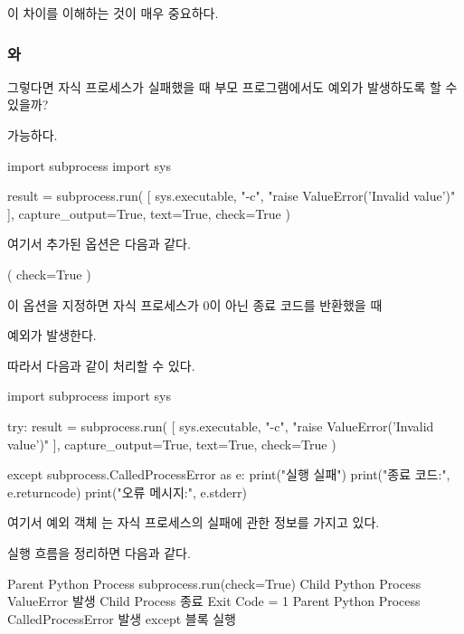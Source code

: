 이 차이를 이해하는 것이 매우 중요하다.

\subsubsection{와 }

그렇다면 자식 프로세스가 실패했을 때 부모 프로그램에서도 예외가 발생하도록 할 수 있을까?

가능하다.

\begin{dhkcode}
import subprocess
import sys

result = subprocess.run(
    [
        sys.executable,
        "-c",
        "raise ValueError('Invalid value')"
    ],
    capture_output=True,
    text=True,
    check=True
)
\end{dhkcode}

여기서 추가된 옵션은 다음과 같다.

\begin{dhkcode}
(
    check=True
)
\end{dhkcode}

이 옵션을 지정하면 자식 프로세스가 0이 아닌 종료 코드를 반환했을 때

 예외가 발생한다.

따라서 다음과 같이 처리할 수 있다.

\begin{dhkcode}
import subprocess
import sys

try:
    result = subprocess.run(
        [
            sys.executable,
            "-c",
            "raise ValueError('Invalid value')"
        ],
        capture_output=True,
        text=True,
        check=True
    )

except subprocess.CalledProcessError as e:
    print("실행 실패")
    print("종료 코드:", e.returncode)
    print("오류 메시지:", e.stderr)
\end{dhkcode}

여기서 예외 객체 는 자식 프로세스의 실패에 관한 정보를 가지고 있다.

실행 흐름을 정리하면 다음과 같다.

\begin{dhksmry}[centered]
Parent Python Process
\da
subprocess.run(check=True)
\da
Child Python Process
\da
ValueError 발생
\da
Child Process 종료
\da
Exit Code = 1
\da
Parent Python Process
\da
CalledProcessError 발생
\da
except 블록 실행
\end{dhksmry}

